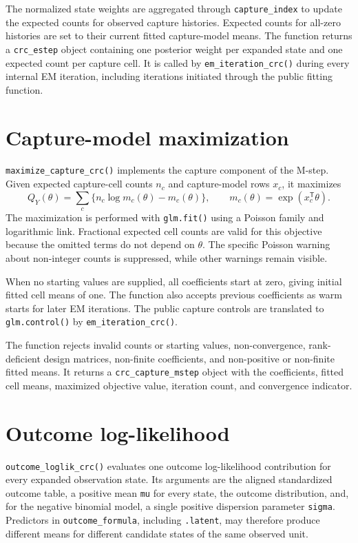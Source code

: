 \documentclass[11pt,letterpaper]{article}
\begin{document}
The normalized state weights are aggregated through \texttt{capture\_index}
to update the expected counts for observed capture histories. Expected counts
for all-zero histories are set to their current fitted capture-model means.
The function returns a \texttt{crc\_estep} object containing one
posterior weight per expanded state and one expected count per capture cell.
It is called by \texttt{em\_iteration\_crc()} during every internal EM
iteration, including iterations initiated through the public fitting function.

\section{Capture-model maximization}

\texttt{maximize\_capture\_crc()} implements the capture component of the
M-step. Given expected capture-cell counts $n_c$ and capture-model rows $x_c$,
it maximizes
\[
  Q_Y(\theta)=\sum_c\{n_c\log m_c(\theta)-m_c(\theta)\},
  \qquad m_c(\theta)=\exp(x_c^\mathsf{T}\theta).
\]
The maximization is performed with \texttt{glm.fit()} using a Poisson family
and logarithmic link. Fractional expected cell counts are valid for this
objective because the omitted terms do not depend on $\theta$. The specific
Poisson warning about non-integer counts is suppressed, while other warnings
remain visible.

When no starting values are supplied, all coefficients start at zero, giving
initial fitted cell means of one. The function also accepts previous
coefficients as warm starts for later EM iterations. The public capture
controls are translated to \texttt{glm.control()} by
\texttt{em\_iteration\_crc()}.

The function rejects invalid counts or starting values, non-convergence,
rank-deficient design matrices, non-finite coefficients, and non-positive or
non-finite fitted means. It returns a \texttt{crc\_capture\_mstep} object with
the coefficients, fitted cell means, maximized objective value, iteration
count, and convergence indicator.

\section{Outcome log-likelihood}

\texttt{outcome\_loglik\_crc()} evaluates one outcome log-likelihood
contribution for every expanded observation state. Its arguments are the
aligned standardized outcome table, a positive mean \texttt{mu} for every
state, the outcome distribution, and, for the negative binomial model, a
single positive dispersion parameter \texttt{sigma}. Predictors in
\texttt{outcome\_formula}, including \texttt{.latent}, may therefore produce
different means for different candidate states of the same observed unit.
\end{document}
